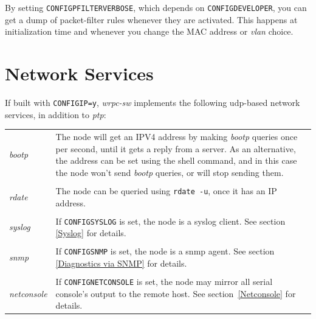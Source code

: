 \documentclass[a4paper, 12pt]{article}
\renewcommand{\_}{\underscore\allowbreak}
\begin{document}
By setting \texttt{CONFIG\_PFILTER\_VERBOSE}, which depends on
\texttt{CONFIG\_DEVELOPER}, you can get a dump of packet-filter rules
whenever they are activated.  This happens at initialization time and
whenever you change the MAC address or \textit{vlan} choice.

\newpage
\section{Network Services}
\label{Network Services}

If built with \texttt{CONFIG\_IP=y}, \textit{wrpc-sw} implements the following
udp-based network services, in addition to \textit{ptp}:

\begin{longtable}{  p{6.5cm}  p{9cm} }

\textit{ bootp } &

	The node will get an IPV4 address by making \textit{bootp} queries
        once per second, until it gets a reply from a server. As an
        alternative, the address can be set using the shell command,
        and in this case the node won't send \textit{bootp} queries, or will
        stop sending them.\\
& \\
\textit{ rdate } &

	The node can be queried using \texttt{rdate -u}, once it has an IP
        address.\\
& \\
\textit{ syslog } &

	If \texttt{CONFIG\_SYSLOG} is set, the node is a syslog client.
        See section \ref{Syslog} for details.\\
& \\
\textit{ snmp } &

	If \texttt{CONFIG\_SNMP} is set, the node is a snmp agent.
        See section \ref{Diagnostics via SNMP} for details.\\
& \\
\textit{ netconsole } &

	If \texttt{CONFIG\_NETCONSOLE} is set, the node may mirror all serial
	console's output to the remote host. See section~\ref{Netconsole}
	for details.\\

\end{longtable}

\newpage
\end{document}
